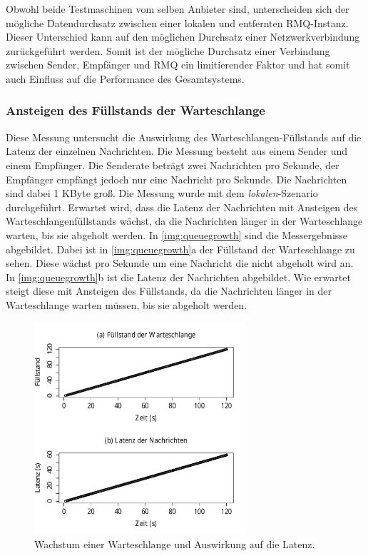 Obwohl beide Testmaschinen vom selben Anbieter sind, unterscheiden sich der mögliche Datendurchsatz zwischen einer lokalen und entfernten RMQ-Instanz. Dieser Unterschied kann auf den möglichen Durchsatz einer Netzwerkverbindung zurückgeführt werden. Somit ist der mögliche Durchsatz einer Verbindung zwischen Sender, Empfänger und RMQ ein limitierender Faktor und hat somit auch Einfluss auf die Performance des Gesamtsystems.

\subsubsection{Ansteigen des Füllstands der Warteschlange}
\label{sec:queueGrowth}
Diese Messung untersucht die Auswirkung des Warteschlangen-Füllstands auf die Latenz der einzelnen Nachrichten. Die Messung besteht aus einem Sender und einem Empfänger. Die Senderate beträgt zwei Nachrichten pro Sekunde, der Empfänger empfängt jedoch nur eine Nachricht pro Sekunde. Die Nachrichten sind dabei 1 KByte groß. Die Messung wurde mit dem \textit{lokalen}-Szenario durchgeführt. Erwartet wird, dass die Latenz der Nachrichten mit Ansteigen des Warteschlangenfüllstands wächst, da die Nachrichten länger in der Warteschlange warten, bis sie abgeholt werden.
In \autoref{img:queuegrowth} sind die Messergebnisse abgebildet. Dabei ist in \autoref{img:queuegrowth}a der Füllstand der Warteschlange zu sehen. Diese wächst pro Sekunde um eine Nachricht die nicht abgeholt wird an. In \autoref{img:queuegrowth}b ist die Latenz der Nachrichten abgebildet. Wie erwartet steigt diese mit Ansteigen des Füllstands, da die Nachrichten länger in der Warteschlange warten müssen, bis sie abgeholt werden.
\begin{figure}
\center
  \includegraphics[width=0.7\textwidth]{images/measurement/queuegrowth.pdf}
  \caption{Wachstum einer Warteschlange und Auswirkung auf die Latenz.}
  \label{img:queuegrowth}
\end{figure}

